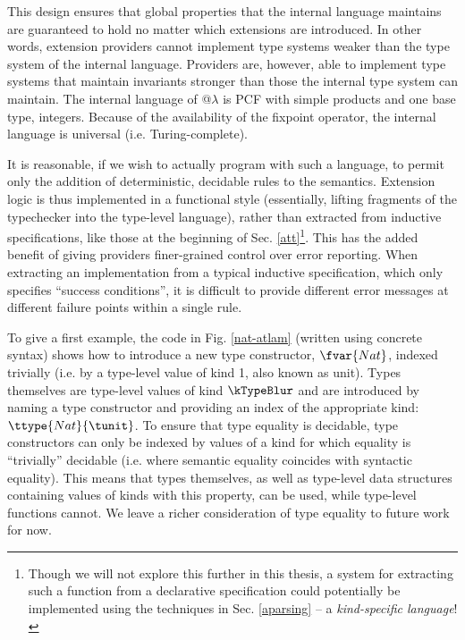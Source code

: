 This design ensures that global properties that the internal language maintains are guaranteed to hold no matter which extensions are introduced. In other words, extension providers cannot implement type systems weaker than the type system of the internal language. Providers are, however, able to implement type systems that maintain invariants stronger than those the internal type system can maintain. The internal language of @$\lambda$ is PCF with simple products and one base type, integers. Because of the availability of the fixpoint operator, the internal language is universal (i.e. Turing-complete).

It is reasonable, if we wish to actually program with such a language, to permit only the addition of deterministic, decidable rules to the semantics. Extension logic is thus implemented in a functional style  (essentially, lifting fragments of the typechecker into the type-level language), rather than extracted from inductive specifications, like those at the beginning of Sec. \ref{att}\footnote{Though we will not explore this further in this thesis, a system for extracting such a function from a declarative specification could potentially be implemented using the techniques in Sec. \ref{aparsing} -- a \emph{kind-specific language}!}. This has the added benefit of giving providers finer-grained control over error reporting. When extracting an implementation from a typical inductive specification, which only specifies ``success conditions'', it is difficult to provide different error messages at different failure points within a single rule.

To give a first example, the code in Fig. \ref{nat-atlam} (written using concrete syntax) shows how to introduce a new type constructor, $\fvar{Nat}$, indexed trivially (i.e. by a type-level value of kind 1, also known as unit). Types themselves are type-level values of kind $\kTypeBlur$ and are introduced by naming a type constructor and providing an index of the appropriate kind: $\ttype{Nat}{\tunit}$. To ensure that type equality is decidable, type constructors can only be indexed by values of a kind for which equality is ``trivially'' decidable (i.e. where semantic equality coincides with syntactic equality). This means that types themselves, as well as type-level data structures containing values of kinds with this property, can be used, while type-level functions cannot. We leave a richer consideration of type equality to future work for now.

